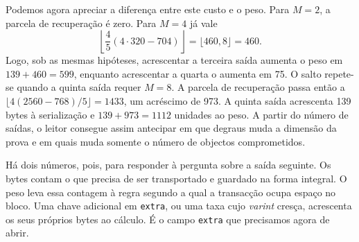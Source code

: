 Podemos agora apreciar a diferença entre este custo e o peso.
Para \(M=2\), a parcela de recuperação é zero. Para \(M=4\)
já vale
\[
 \left\lfloor\frac45(4\cdot320-704)\right\rfloor
       =\lfloor460{,}8\rfloor=460 .
\]
Logo, sob as mesmas hipóteses, acrescentar a terceira saída aumenta
o peso em \(139+460=599\), enquanto acrescentar a quarta o aumenta
em 75. O salto repete-se quando a quinta saída requer \(M=8\).
A parcela de recuperação passa então a
\(\lfloor4(2560-768)/5\rfloor=1433\), um acréscimo de 973.
A quinta saída acrescenta 139 bytes à serialização e
\(139+973=1112\) unidades ao peso. A partir do número de saídas,
o leitor consegue assim antecipar em que degraus muda a dimensão
da prova e em quais muda somente o número de objectos comprometidos.

Há dois números, pois, para responder à pergunta sobre a saída
seguinte. Os bytes contam o que precisa de ser transportado e
guardado na forma integral. O peso leva essa contagem à regra
segundo a qual a transacção ocupa espaço no bloco. Uma chave
adicional em \texttt{extra}, ou uma taxa cujo \emph{varint} cresça,
acrescenta os seus próprios bytes ao cálculo. É o campo
\texttt{extra} que precisamos agora de abrir.
